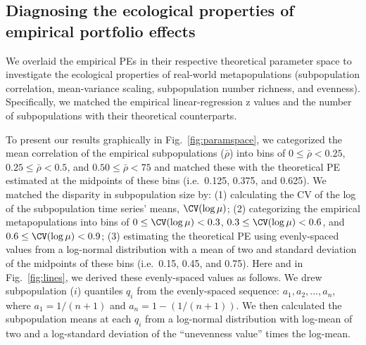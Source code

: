 \subsection{Diagnosing the ecological properties of empirical portfolio effects}

We overlaid the empirical PEs in their respective theoretical parameter space
to investigate the ecological properties of real-world metapopulations
(subpopulation correlation, mean-variance scaling, subpopulation number
richness, and evenness). Specifically, we matched the empirical
linear-regression z values and the number of subpopulations with their
theoretical counterparts.

To present our results graphically in Fig.~\ref{fig:paramspace}, we categorized
the mean correlation of the empirical subpopulations ($\bar{\rho}$) into bins of
$0 \le \bar{\rho} < 0.25$, $0.25 \le \bar{\rho} < 0.5$, and $0.50 \le \bar{\rho}
< 75$ and matched these with the theoretical PE estimated at the midpoints of
these bins (i.e.\ 0.125, 0.375, and 0.625).  We matched the disparity in
subpopulation size by: (1) calculating the CV of the log of the subpopulation
time series' means, $\CV(\log\mu)$; (2) categorizing the empirical
metapopulations into bins of $0 \le \CV(\log\mu) < 0.3$, $0.3 \le \CV(\log\mu) <
0.6$, and $0.6 \le \CV(\log\mu) < 0.9$; (3) estimating the theoretical PE using
evenly-spaced values from a log-normal distribution with a mean of two and
standard deviation of the midpoints of these bins (i.e.\ 0.15, 0.45, and 0.75).
Here and in Fig.~\ref{fig:lines}, we derived these evenly-spaced values as
follows.
We drew subpopulation ($i$) quantiles $q_i$ from the evenly-spaced sequence:
$a_1, a_2, \ldots, a_n$, where $a_1 = 1/(n+1)$ and $a_n = 1-(1/(n+1))$. We then
calculated the subpopulation means at each $q_i$ from a log-normal distribution
with log-mean of two and a log-standard deviation of the ``unevenness value''
times the log-mean.

